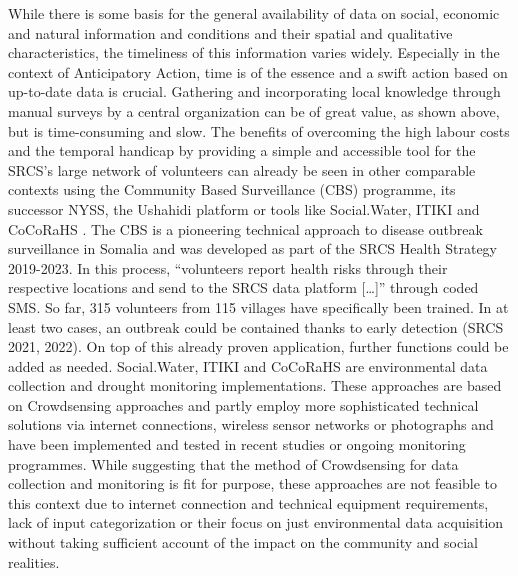 While there is some basis for the general availability of data on social, economic and natural information and conditions and their spatial and qualitative characteristics, the timeliness of this information varies widely. Especially in the context of Anticipatory Action, time is of the essence and a swift action based on up-to-date data is crucial. Gathering and incorporating local knowledge through manual surveys by a central organization can be of great value, as shown above, but is time-consuming and slow.\newline
The benefits of overcoming the high labour costs and the temporal handicap by providing a simple and accessible tool for the SRCS’s large network of volunteers can already be seen in other comparable contexts using the Community Based Surveillance (CBS) programme, its successor NYSS, the Ushahidi platform or tools like Social.Water, ITIKI and CoCoRaHS \autocite{fienenSocialWaterCrowdsourcing2012a}\autocite{fienenSocialWaterCrowdsourcing2012a,lackstromBackyardHydroclimatologyCitizen2022,masindeITIKIMobileBased2019,NyssplatformnorcrossNyss2022,RedCrossRed}. The CBS is a pioneering technical approach to disease outbreak surveillance in Somalia and was developed as part of the SRCS Health Strategy 2019-2023. In this process, “volunteers report health risks through their respective locations and send to the SRCS data platform [\dots]” \autocite[57]{somaliredcrescentsocietyFeasibilityStudyPotential2022} through coded SMS. So far, 315 volunteers from 115 villages have specifically been trained. In at least two cases, an outbreak could be contained thanks to early detection (SRCS 2021, 2022). On top of this already proven application, further functions could be added as needed.\newline
Social.Water, ITIKI and CoCoRaHS are environmental data collection and drought monitoring implementations. These approaches are based on Crowdsensing approaches and partly employ more sophisticated technical solutions via internet connections, wireless sensor networks or photographs and have been implemented and tested in recent studies or ongoing monitoring programmes. While suggesting that the method of Crowdsensing for data collection and monitoring is fit for purpose, these approaches are not feasible to this context due to internet connection and technical equipment requirements, lack of input categorization or their focus on just environmental data acquisition without taking sufficient account of the impact on the community and social realities.


